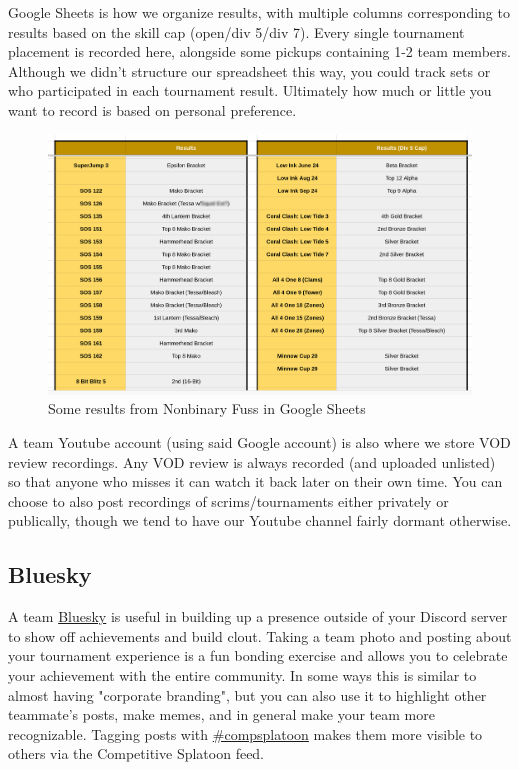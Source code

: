 \documentclass[12pt]{article}
\begin{document}
Google Sheets is how we organize results, with multiple columns corresponding to results based on the skill cap (open/div 5/div 7). Every single tournament placement is recorded here, alongside some pickups containing 1-2 team members. Although we didn't structure our spreadsheet this way, you could track sets or who participated in each tournament result. Ultimately how much or little you want to record is based on personal preference. 
\begin{figure}
    \centering
    \includegraphics[width=1\linewidth]{google_sheets.png}
\caption{Some results from Nonbinary Fuss in Google Sheets}
\end{figure}

A team Youtube account (using said Google account) is also where we store VOD review recordings. Any VOD review is always recorded (and uploaded unlisted) so that anyone who misses it can watch it back later on their own time. You can choose to also post recordings of scrims/tournaments either privately or publically, though we tend to have our Youtube channel fairly dormant otherwise.

\subsection{Bluesky}
A team \href{https://bsky.app}{Bluesky} is useful in building up a presence outside of your Discord server to show off achievements and build clout. Taking a team photo and posting about your tournament experience is a fun bonding exercise and allows you to celebrate your achievement with the entire community. In some ways this is similar to almost having "corporate branding", but you can also use it to highlight other teammate's posts, make memes, and in general make your team more recognizable. Tagging posts with \href{https://bsky.app/profile/kibryhouse.bsky.social/feed/comp-splatoon}{\#compsplatoon} makes them more visible to others via the Competitive Splatoon feed.
\end{document}

